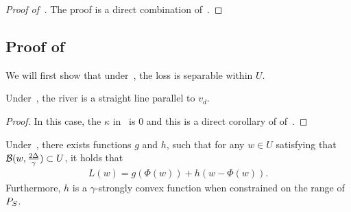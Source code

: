 \begin{proof}[Proof of~]
The proof is a direct combination of~.
\end{proof}




\subsection{Proof of~}
\label{app:sgd}

We will first show that under~, the loss is separable within $U$.

\begin{lemma}
\label{lem:straightriver}
Under~, the river is a straight line parallel to $v_d$.
\end{lemma}

\begin{proof}
    In this case, the $\kappa$ in~ is $0$ and this is a direct corollary of of~.
\end{proof}


\begin{lemma}
\label{lem:separable}
Under~, there exists functions $g$ and $h$, such that for any $w \in U$ satisfying that $\mathcal{B}(w, \frac{2 \Delta}{\gamma}) \subset U$, it holds that
\begin{align*}
    L(w) = g(\Phi(w)) + h(w - \Phi(w)).
\end{align*}
Furthermore, $h$ is a $\gamma$-strongly convex function when constrained on the range of ${P}_S$. 
\end{lemma}

